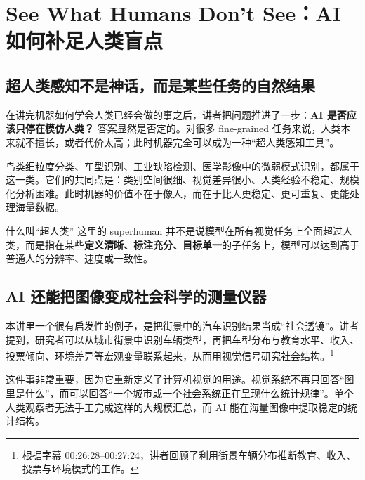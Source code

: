\section{See What Humans Don't See：AI 如何补足人类盲点}

\subsection{超人类感知不是神话，而是某些任务的自然结果}

在讲完机器如何学会人类已经会做的事之后，讲者把问题推进了一步：\textbf{AI 是否应该只停在模仿人类？} 答案显然是否定的。对很多 fine-grained 任务来说，人类本来就不擅长，或者代价太高；此时机器完全可以成为一种``超人类感知工具''。

鸟类细粒度分类、车型识别、工业缺陷检测、医学影像中的微弱模式识别，都属于这一类。它们的共同点是：类别空间很细、视觉差异很小、人类经验不稳定、规模化分析困难。此时机器的价值不在于像人，而在于比人更稳定、更可重复、更能处理海量数据。

\begin{knowledgebox}{什么叫``超人类''}
这里的 superhuman 并不是说模型在所有视觉任务上全面超过人类，而是指在某些\textbf{定义清晰、标注充分、目标单一}的子任务上，模型可以达到高于普通人的分辨率、速度或一致性。
\end{knowledgebox}

\subsection{AI 还能把图像变成社会科学的测量仪器}

本讲里一个很有启发性的例子，是把街景中的汽车识别结果当成``社会透镜''。讲者提到，研究者可以从城市街景中识别车辆类型，再把车型分布与教育水平、收入、投票倾向、环境差异等宏观变量联系起来，从而用视觉信号研究社会结构。\footnote{根据字幕 00:26:28--00:27:24，讲者回顾了利用街景车辆分布推断教育、收入、投票与环境模式的工作。}

这件事非常重要，因为它重新定义了计算机视觉的用途。视觉系统不再只回答``图里是什么''，而可以回答``一个城市或一个社会系统正在呈现什么统计规律''。单个人类观察者无法手工完成这样的大规模汇总，而 AI 能在海量图像中提取稳定的统计结构。

